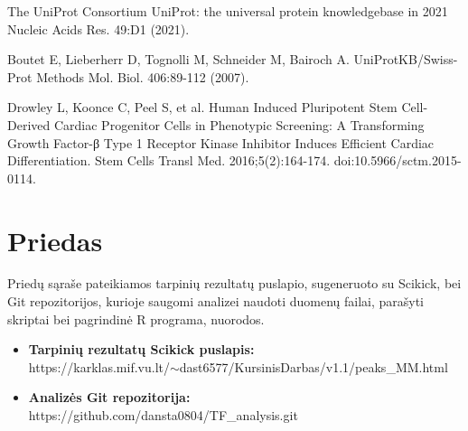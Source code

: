 \documentclass[12pt]{article}
\begin{document}
\begin{thebibliography}{99}
 The UniProt Consortium UniProt: the universal protein
knowledgebase in 2021 Nucleic Acids Res. 49:D1 (2021).

 Boutet E, Lieberherr D, Tognolli M, Schneider M, Bairoch A.
UniProtKB/Swiss-Prot Methods Mol. Biol. 406:89-112 (2007).

 Drowley L, Koonce C, Peel S, et al. Human
Induced Pluripotent Stem Cell-Derived Cardiac Progenitor Cells in Phenotypic
Screening: A Transforming Growth Factor-β Type 1 Receptor Kinase Inhibitor
Induces Efficient Cardiac Differentiation. Stem Cells Transl Med.
2016;5(2):164-174. doi:10.5966/sctm.2015-0114.

\end{thebibliography}

\newpage


\section{Priedas}

Priedų sąraše pateikiamos tarpinių rezultatų puslapio, sugeneruoto su Scikick,
bei Git repozitorijos, kurioje saugomi analizei naudoti duomenų failai,
parašyti skriptai bei pagrindinė R programa, nuorodos.

\begin{itemize}
    \item \textbf{Tarpinių rezultatų Scikick puslapis:}\\
        https://karklas.mif.vu.lt/\(\sim\)dast6577/KursinisDarbas/v1.1/peaks\_MM.html
    \item \textbf{Analizės Git repozitorija:}\\
        https://github.com/dansta0804/TF\_analysis.git
  \end{itemize}
\end{document}
